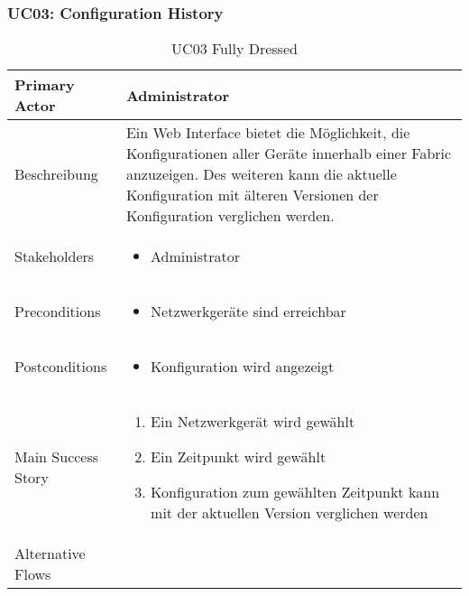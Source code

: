 \subsubsection{UC03: Configuration History}
\begin{table}[H]
	\centering
	\begin{tabularx}{\textwidth}{l | X}
		Primary Actor      & Administrator        \\
		\hline
		Beschreibung       & Ein Web Interface bietet die Möglichkeit, die Konfigurationen aller Geräte innerhalb einer Fabric anzuzeigen. Des weiteren kann die aktuelle Konfiguration mit älteren Versionen der Konfiguration verglichen werden. \\ 
		\hline
		Stakeholders       &  
		\begin{itemize}	
			\item Administrator
		\end{itemize}              \\
		\hline
		Preconditions      & 
		\begin{itemize}	
			\item Netzwerkgeräte sind erreichbar
		\end{itemize}  \\
		\hline
		Postconditions     & 
		\begin{itemize}	
			\item Konfiguration wird angezeigt
		\end{itemize}  \\
		\hline
		Main Success Story & 
		\begin{enumerate}
			\item Ein Netzwerkgerät wird gewählt
			\item Ein Zeitpunkt wird gewählt
			\item Konfiguration zum gewählten Zeitpunkt kann mit der aktuellen Version verglichen werden
		\end{enumerate}
		\\
		\hline
		Alternative Flows  & 
	\end{tabularx}
	\caption{UC03 Fully Dressed}
	\label{tab:UC03}
\end{table}